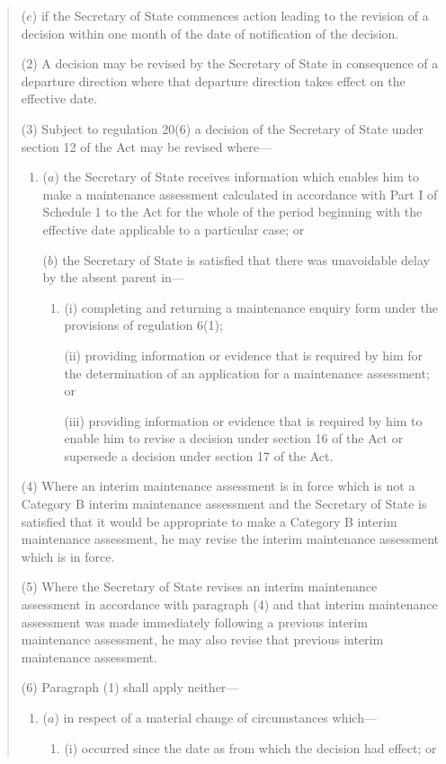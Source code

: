 \documentclass[12pt,a4paper]{article}
\begin{document}
\begin{quotation}
\begin{enumerate}
($e$) if the Secretary of State commences action leading to the revision of a decision within one month of the date of notification of the decision.
\end{enumerate}

(2) A decision may be revised by the Secretary of State in consequence of a departure direction where that departure direction takes effect on the effective date.

(3) Subject to regulation 20(6) a decision of the Secretary of State under section 12 of the Act may be revised where---
\begin{enumerate}\item[]
($a$) the Secretary of State receives information which enables him to make a maintenance assessment calculated in accordance with Part I of Schedule 1 to the Act for the whole of the period beginning with the effective date applicable to a particular case; or

($b$) the Secretary of State is satisfied that there was unavoidable delay by the absent parent in---
\begin{enumerate}\item[]
(i) completing and returning a maintenance enquiry form under the provisions of regulation 6(1);

(ii) providing information or evidence that is required by him for the determination of an application for a maintenance assessment; or

(iii) providing information or evidence that is required by him to enable him to revise a decision under section 16 of the Act or supersede a decision under section 17 of the Act.
\end{enumerate}
\end{enumerate}

(4) Where an interim maintenance assessment is in force which is not a Category B interim maintenance assessment and the Secretary of State is satisfied that it would be appropriate to make a Category B interim maintenance assessment, he may revise the interim maintenance assessment which is in force.

(5) Where the Secretary of State revises an interim maintenance assessment in accordance with paragraph (4) and that interim maintenance assessment was made immediately following a previous interim maintenance assessment, he may also revise that previous interim maintenance assessment.

(6) Paragraph (1) shall apply neither---
\begin{enumerate}\item[]
\begin{sloppypar}
($a$) in respect of a material change of circumstances which—
\end{sloppypar}
\begin{enumerate}\item[]
(i) occurred since the date as from which the decision had effect; or


\end{enumerate}
\end{enumerate}
\end{quotation}
\end{document}
